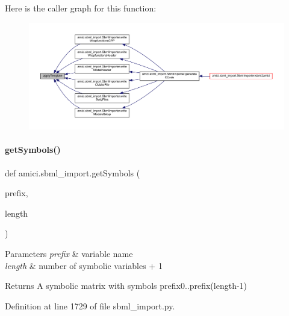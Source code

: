 Here is the caller graph for this function\+:
\nopagebreak
\begin{figure}[H]
\begin{center}
\leavevmode
\includegraphics[width=350pt]{namespaceamici_1_1sbml__import_a48216d1729cee722a7aa363d9ecc63c4_icgraph}
\end{center}
\end{figure}
\mbox{\label{namespaceamici_1_1sbml__import_a986c53b165e78ab8ba560976b4506294}} 
\paragraph{\texorpdfstring{get\+Symbols()}{getSymbols()}}
{\footnotesize\ttfamily def amici.\+sbml\+\_\+import.\+get\+Symbols (\begin{DoxyParamCaption}\item[{}]{prefix,  }\item[{}]{length }\end{DoxyParamCaption})}


\begin{DoxyParams}{Parameters}
{\em prefix} & variable name \\
\hline
{\em length} & number of symbolic variables + 1\\
\hline
\end{DoxyParams}
\begin{DoxyReturn}{Returns}
A symbolic matrix with symbols prefix0..prefix(length-\/1) 
\end{DoxyReturn}


Definition at line 1729 of file sbml\+\_\+import.\+py.

